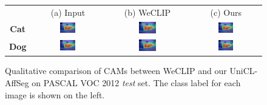 \begin{figure}[ht]
  \centering
  \setlength{\tabcolsep}{2pt} %
  \renewcommand{\arraystretch}{0.9}

  \begin{tabular}{c c c c} %
    & (a) Input & (b) WeCLIP & (c) Ours \\[1mm]

    \textbf{Cat} &
    \includegraphics[width=0.23\textwidth]{figures/qualitative_analysis/test_cam/2010_005860_6.jpg} &
    \includegraphics[width=0.23\textwidth]{figures/qualitative_analysis/test_cam/2010_005860_6.jpg} &
    \includegraphics[width=0.23\textwidth]{figures/qualitative_analysis/test_cam/2010_005860_6.jpg} \\

    \textbf{Dog} &
    \includegraphics[width=0.23\textwidth]{figures/qualitative_analysis/test_cam/2010_005860_6.jpg} &
    \includegraphics[width=0.23\textwidth]{figures/qualitative_analysis/test_cam/2010_005860_6.jpg} &
    \includegraphics[width=0.23\textwidth]{figures/qualitative_analysis/test_cam/2010_005860_6.jpg} \\
  \end{tabular}

  \caption{Qualitative comparison of CAMs between WeCLIP and our UniCL-AffSeg on PASCAL VOC 2012 \textit{test} set. The class label for each image is shown on the left.}
  \label{fig:qualitative_comparison_cam}
\end{figure}

